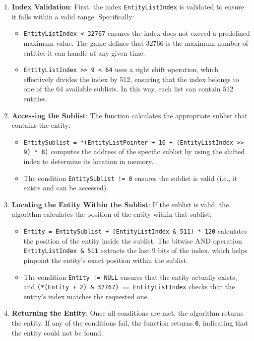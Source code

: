 \begin{enumerate}
    \item \textbf{Index Validation}: First, the index \texttt{EntityListIndex} is validated to ensure it falls within a valid range. Specifically:
    \begin{itemize}
        \item \texttt{EntityListIndex < 32767} ensures the index does not exceed a predefined maximum value. The game defines that 32766 is the maximum number of entities it can handle at any given time.
        \item \texttt{EntityListIndex >> 9 < 64} uses a right shift operation, which effectively divides the index by 512, ensuring that the index belongs to one of the 64 available sublists. In this way, each list can contain 512 entities.
    \end{itemize}
    
    \item \textbf{Accessing the Sublist}: The function calculates the appropriate sublist that contains the entity:
    \begin{itemize}
        \item \texttt{EntitySublist = *(EntityListPointer + 16 + (EntityListIndex >> 9) * 8)} computes the address of the specific sublist by using the shifted index to determine its location in memory.
        \item The condition \texttt{EntitySublist != 0} ensures the sublist is valid (i.e., it exists and can be accessed).
    \end{itemize}
    
    \item \textbf{Locating the Entity Within the Sublist}: If the sublist is valid, the algorithm calculates the position of the entity within that sublist:
    \begin{itemize}
        \item \texttt{Entity = EntitySublist + (EntityListIndex \& 511) * 120} calculates the position of the entity inside the sublist. The bitwise AND operation \texttt{EntityListIndex \& 511} extracts the last 9 bits of the index, which helps pinpoint the entity’s exact position within the sublist.
        \item The condition \texttt{Entity != NULL} ensures that the entity actually exists, and \texttt{(*(Entity + 2) \& 32767) == EntityListIndex} checks that the entity’s index matches the requested one.
    \end{itemize}
    
    \item \textbf{Returning the Entity}: Once all conditions are met, the algorithm returns the entity. If any of the conditions fail, the function returns \texttt{0}, indicating that the entity could not be found.
\end{enumerate}


